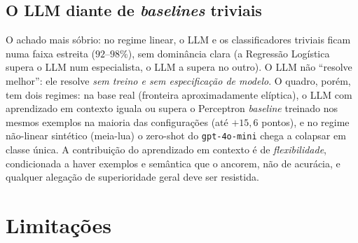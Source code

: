 \documentclass[12pt,a4paper]{article}
\begin{document}
\subsection{O LLM diante de \emph{baselines} triviais}
O achado mais sóbrio: no regime linear, o LLM e os classificadores triviais ficam numa
faixa estreita ($92$–$98\%$), sem dominância clara (a Regressão Logística supera o LLM num
especialista, o LLM a supera no outro). O LLM não ``resolve melhor'': ele resolve \emph{sem
treino e sem especificação de modelo}. O quadro, porém, tem dois regimes: na base real
(fronteira aproximadamente elíptica), o LLM com aprendizado em contexto iguala ou supera o Perceptron
\emph{baseline} treinado nos mesmos exemplos na maioria das configurações (até $+15{,}6$
pontos), e no regime não-linear sintético (meia-lua) o zero-shot do \texttt{gpt-4o-mini}
chega a colapsar em classe única. A contribuição do aprendizado em contexto é de
\emph{flexibilidade},
condicionada a haver exemplos e semântica que o ancorem, não de acurácia, e qualquer
alegação de superioridade geral deve ser resistida.

\section{Limitações}
\label{sec:limitacoes}
\end{document}
